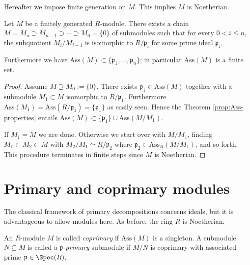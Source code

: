 Hereafter we impose finite generation on $M$. This implies $M$ is Noetherian.
\begin{theorem}
	Let $M$ be a finitely generated $R$-module. There exists a chain $M = M_n \supset M_{n-1} \supset \cdots \supset M_0 = \{0\}$ of submodules such that for every $0 < i \leq n$, the subquotient $M_i/M_{i-1}$ is isomorphic to $R/\mathfrak{p}_i$ for some prime ideal $\mathfrak{p}_i$.
	
	Furthermore we have $\mathrm{Ass}(M) \subset \{\mathfrak{p}_1, \ldots, \mathfrak{p}_n \}$; in particular $\mathrm{Ass}(M)$ is a finite set.
\end{theorem}
\begin{proof}
	Assume $M \supsetneq M_0 := \{0\}$. There exists $\mathfrak{p}_1 \in \text{Ass}(M)$ together with a submodule $M_1 \subset M$ isomorphic to $R/\mathfrak{p}_1$. Furthermore $\text{Ass}(M_1) = \text{Ass}(R/\mathfrak{p}_1) = \{ \mathfrak{p}_1\}$ as easily seen. Hence the Theorem \ref{prop:Ass-properties} entails $\text{Ass}(M) \subset \{\mathfrak{p}_1\} \cup \text{Ass}(M/M_1)$.

	If $M_1 = M$ we are done. Otherwise we start over with $M/M_1$, finding $M_1 \subset M_2 \subset M$ with $M_2/M_1 \simeq R/\mathfrak{p}_2$ where $\mathfrak{p}_2 \in \text{Ass}_R(M/M_1)$, and so forth. This procedure terminates in finite steps since $M$ is Noetherian.
\end{proof}

\section{Primary and coprimary modules}
The classical framework of primary decompositions concerns ideals, but it is advantageous to allow modules here. As before, the ring $R$ is Noetherian.

\begin{definition}
	An $R$-module $M$ is called \emph{coprimary} if $\text{Ass}(M)$ is a singleton. A submodule $N \subsetneq M$ is called a $\mathfrak{p}$-\emph{primary} submodule if $M/N$ is coprimary with associated prime $\mathfrak{p} \in \Spec(R)$.
\end{definition}

